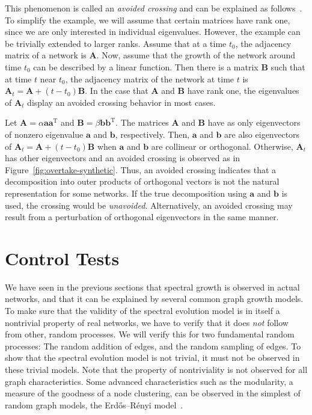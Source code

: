 \documentclass[11pt,a4paper]{book}
\begin{document}
This phenomenon is called an \emph{avoided crossing} and can be
explained as follows~\cite[8.5]{b516}.  To simplify the example, we will
assume that certain matrices have rank one, since we are only interested
in individual eigenvalues.  However, the example can be trivially
extended to larger ranks. 
Assume that at a time $t_0$, the adjacency matrix of a network is
$\mathbf A$. 
Now, assume that the growth of the network
around time $t_0$ can be described by a linear function.  Then there is
a matrix $\mathbf B$ such that at time $t$ near $t_0$, the adjacency
matrix of the network at time $t$ is $\mathbf A_t = \mathbf A+(t-t_0)\mathbf B$.  
In the case that $\mathbf A$ and $\mathbf B$ have rank one, the
eigenvalues of $\mathbf A_t$ display an avoided crossing
behavior in most cases. 

Let $\mathbf A=\alpha \mathbf a \mathbf a^{\mathrm T}$ and $\mathbf B = \beta
\mathbf b \mathbf b^{\mathrm T}$.  The matrices $\mathbf A$ and $\mathbf
B$ have as only eigenvectors of nonzero eigenvalue $\mathbf a$ and $\mathbf
b$, respectively. 
Then, $\mathbf a$ and $\mathbf b$ are also eigenvectors of $\mathbf A_t=\mathbf
A+(t-t_0)\mathbf B$ when $\mathbf a$ and $\mathbf 
b$ are collinear or orthogonal.  Otherwise, $\mathbf A_t$ has other
eigenvectors and
an avoided crossing is observed as in
Figure~\ref{fig:overtake-synthetic}. 
Thus, an avoided crossing indicates that a decomposition into
outer products of orthogonal vectors is not the natural representation
for some networks.  If the true decomposition using $\mathbf a$ and
$\mathbf b$ is used,
the crossing would be \emph{unavoided}.  Alternatively, an avoided crossing
may result from a perturbation of orthogonal eigenvectors in the
same manner. 

\section{Control Tests}
\label{sec:spectral-evolution-model:control}
We have seen in the previous sections that spectral growth is observed
in actual networks, and that it can be explained by several common graph
growth models.  To make sure that the validity of the spectral evolution
model is in itself a 
nontrivial property of real networks, we have to verify that it does
\emph{not} follow from other, random processes.  
We will verify this for two fundamental random processes:  
The random addition of edges, and the random sampling of edges.  To show
that the spectral evolution model is not trivial, it must not be
observed in these trivial models. 
Note that the property of nontriviality is not observed for all graph
characteristics.  Some advanced characteristics such as the modularity,
a measure of the goodness of a node clustering, 
can be observed in the simplest of random graph models, the Erdős--Rényi
model~\cite{b641}. 
\end{document}
